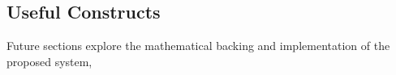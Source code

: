 \subsection{Useful Constructs}

Future sections explore the mathematical backing and implementation of the proposed system, 